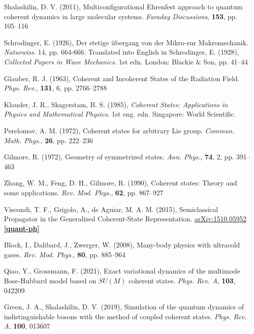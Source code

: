 \documentclass[12pt]{article}
\begin{document}
	
	\begin{thebibliography}{10}

	Shalashilin, D. V. (2011), Multiconfigurational Ehrenfest approach to quantum coherent dynamics in large molecular systems. \textit{Faraday Discussions}, \textbf{153}, pp. 105--116
	
	Schrodinger, E. (1926), Der stetige übergang von der Mikro-zur Makromechanik. \textit{Naturwiss}. 14, pp. 664-666. Translated into English in Schrodinger, E. (1928), \textit{Collected Papers in Wave Mechanics}. 1st edn. London: Blackie \& Son, pp. 41--44
	
	Glauber, R. J. (1963), Coherent and Incoherent States of the Radiation Field. \textit{Phys. Rev.}, \textbf{131}, 6, pp. 2766--2788
	
	Klauder, J. R., Skagerstam, B. S. (1985), \textit{Coherent States: Applications in Physics and Mathematical Physics}. 1st eng. edn. Singapore: World Scientific.
	
	Perelomov, A. M. (1972), Coherent states for arbitrary Lie group. \textit{Commun. Math. Phys.}, \textbf{26}, pp. 222--236
	
	Gilmore, R. (1972), Geometry of symmetrized states. \textit{Ann. Phys.}, \textbf{74}, 2, pp. 391--463
	
	Zhang, W. M., Feng, D. H., Gilmore, R. (1990), Coherent states: Theory and some applications. \textit{Rev. Mod. Phys.}, \textbf{62}, pp. 867--927
	
	Viscondi, T. F., Grigolo, A., de Aguiar, M. A. M. (2015), Semiclassical Propagator in the Generalized Coherent-State Representation. \href{https://doi.org/10.48550/arXiv.1510.05952}{arXiv:1510.05952 \textbf{[quant-ph]}}
	
	Block, I., Dalibard, J., Zwerger, W. (2008), Many-body physics with ultracold gases. \textit{Rev. Mod. Phys.}, \textbf{80}, pp. 885--964
	
	Qiao, Y., Grossmann, F. (2021), Exact variational dynamics of the multimode Bose-Hubbard model based on $SU(M)$ coherent states. \textit{Phys. Rev. A}, \textbf{103}, 042209
	
	Green, J. A., Shalashilin, D. V. (2019), Simulation of the quantum dynamics of indistinguishable bosons with the method of coupled coherent states. \textit{Phys. Rev. A}, \textbf{100}, 013607
	

\end{thebibliography}
\end{document}
